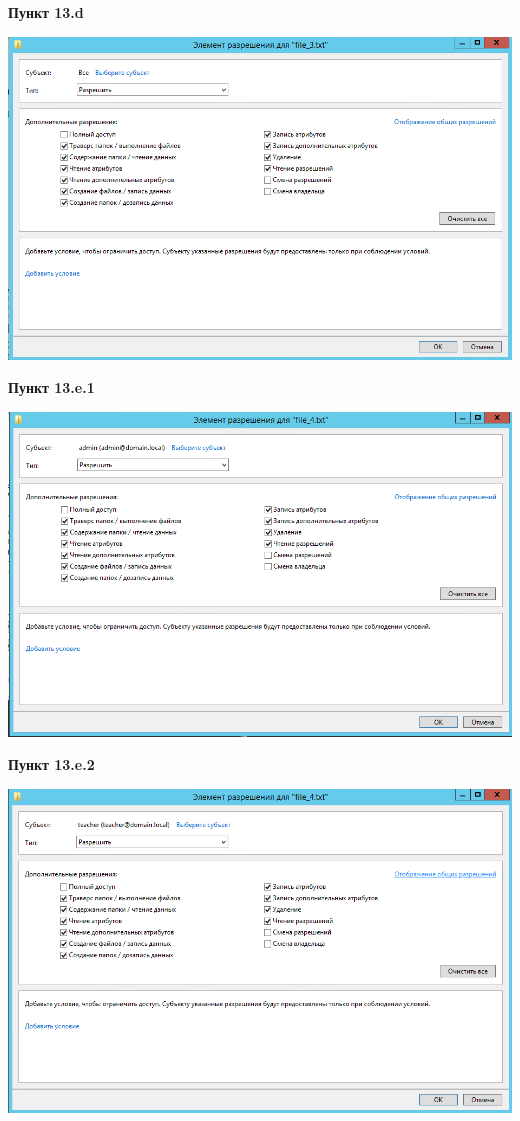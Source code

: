 \documentclass[a4paper,14pt]{extarticle}
\begin{document}
    \textbf{Пункт 13.d}
    \begin{center}
        \includegraphics[scale=0.7]{13.d}
    \end{center}
    \newpage
    \textbf{Пункт 13.e.1}
    \begin{center}
        \includegraphics[scale=0.7]{13.e.1}
    \end{center}
    \textbf{Пункт 13.e.2}
    \begin{center}
        \includegraphics[scale=0.7]{13.e.2}
    \end{center}
\end{document}
